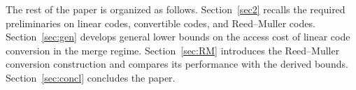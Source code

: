 \documentclass[conference, 10pt]{IEEEtran}
\theoremstyle{plain}
\theoremstyle{definition}
\begin{document}

The rest of the paper is organized as follows. Section~\ref{sec2} recalls the required preliminaries on linear codes, convertible codes, and Reed--Muller codes. Section~\ref{sec:gen} develops general lower bounds on the access cost of linear code conversion in the merge regime. Section~\ref{sec:RM} introduces the Reed--Muller conversion construction and compares its performance with the derived bounds. Section~\ref{sec:concl} concludes the paper.

\end{document}
